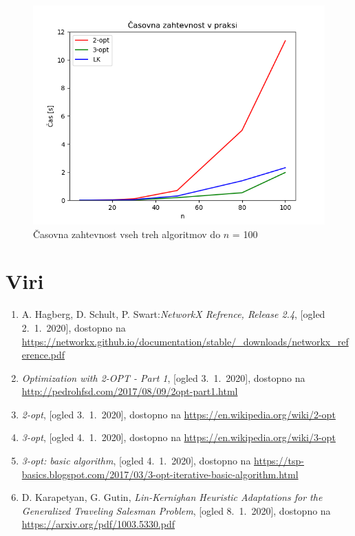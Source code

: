 \documentclass[8pt]{beamer}
\begin{document}
\begin{frame}
\begin{figure}[!h]
 \begin{center}
  \includegraphics[width=12 cm]{casovna_zahtevnost_do_100.png}
  \caption{Časovna zahtevnost vseh treh algoritmov do $n$ = 100}
  \label{casovna_do_100}
\end{center}
\end{figure}
\end{frame}


\section[Viri]{Viri}
\begin{frame}
\begin{enumerate}

\item A. Hagberg, D. Schult, P. Swart:\emph{NetworkX Refrence, Release 2.4}, [ogled 2.~1.~2020], dostopno na \url{https://networkx.github.io/documentation/stable/_downloads/networkx_reference.pdf}

\item \emph{Optimization with 2-OPT - Part 1}, [ogled 3.~1.~2020], dostopno na \url{http://pedrohfsd.com/2017/08/09/2opt-part1.html}

\item \emph{2-opt}, [ogled 3.~1.~2020], dostopno na \url{https://en.wikipedia.org/wiki/2-opt}

\item \emph{3-opt}, [ogled 4.~1.~2020], dostopno na \url{https://en.wikipedia.org/wiki/3-opt}

\item \emph{3-opt: basic algorithm}, [ogled 4.~1.~2020], dostopno na \url{https://tsp-basics.blogspot.com/2017/03/3-opt-iterative-basic-algorithm.html}

\item D. Karapetyan, G. Gutin, \emph{Lin-Kernighan Heuristic Adaptations for the Generalized Traveling Salesman Problem}, [ogled  8.~1.~2020], dostopno na \url{https://arxiv.org/pdf/1003.5330.pdf}
\end{enumerate}
\end{frame}
\end{document}
